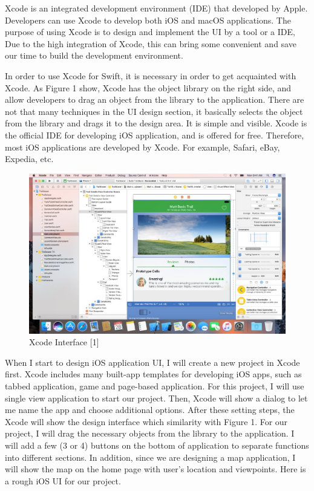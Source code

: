 \documentclass[letterpaper, 10pt,titlepage]{article}
\begin{document}
Xcode is an integrated development environment (IDE) that developed by Apple. Developers can use Xcode to develop both iOS and macOS applications. The purpose of using Xcode is to design and implement the UI by a tool or a IDE, Due to the high integration of Xcode, this can bring some convenient and save our time to build the development environment.

In order to use Xcode for Swift, it is necessary in order to get acquainted with Xcode. As Figure 1 show, Xcode has the object library on the right side, and allow developers to drag an object from the library to the application. There are not that many techniques in the UI design section, it basically selects the object from the library and drags it to the design area. It is simple and visible. Xcode is the official IDE for developing iOS application, and is offered for free. Therefore, most iOS applications are developed by Xcode. For example, Safari, eBay, Expedia, etc.

\begin{figure}[ht]
    \centering
    \includegraphics[scale=0.5]{j1}
    \caption{Xcode Interface [1]}
    \label{jiawei1}
\end{figure}

When I start to design iOS application UI, I will create a new project in Xcode first. Xcode includes many built-app templates for developing iOS apps, such as tabbed application, game and page-based application. For this project, I will use single view application to start our project. Then, Xcode will show a dialog to let me name the app and choose additional options. After these setting steps, the Xcode will show the design interface which similarity with Figure 1. For our project, I will drag the necessary objects from the library to the application. I will add a few (3 or 4) buttons on the bottom of application to separate functions into different sections. In addition, since we are designing a map application, I will show the map on the home page with user’s location and viewpoints. Here is a rough iOS UI for our project.
\end{document}
